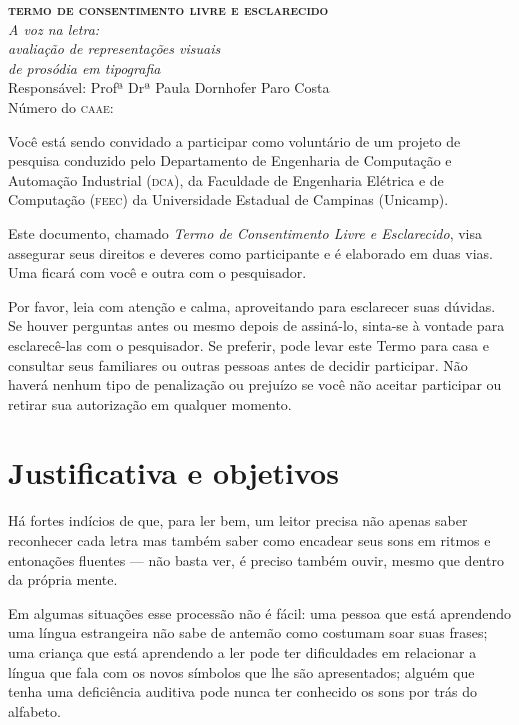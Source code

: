 \documentclass[a4paper,11pt,titlepage,singlespacing]{article}
\begin{document}


	\begin{center}
		\textbf{\Large{\textsc{termo de consentimento livre e esclarecido}}}\\
        \vspace{5pt}
        \huge\textit{A voz na letra: \\ avaliação de representações visuais \\ de prosódia em tipografia}\\
        \vspace{20pt}
        \large{Responsável: Profª Drª Paula Dornhofer Paro Costa}\\
        \vspace{10pt}
        Número do \textsc{caae}: \\
        \vspace{15pt}
	\end{center}

\noindent Você está sendo convidado a participar como voluntário de um projeto de pesquisa conduzido pelo Departamento de Engenharia de Computação e Automação Industrial (\textsc{dca}), da Faculdade de Engenharia Elétrica e de Computação (\textsc{feec}) da Universidade Estadual de Campinas (Unicamp).

Este documento, chamado \textit{Termo de Consentimento Livre e Esclarecido}, visa assegurar seus direitos e deveres como participante e é elaborado em duas vias. Uma ficará com você e outra com o pesquisador.

Por favor, leia com atenção e calma, aproveitando para esclarecer suas dúvidas. Se houver perguntas antes ou mesmo depois de assiná-lo, sinta-se à vontade para esclarecê-las com o pesquisador. Se preferir, pode levar este Termo para casa e consultar seus familiares ou outras pessoas antes de decidir participar. Não haverá nenhum tipo de penalização ou prejuízo se você não aceitar participar ou retirar sua
autorização em qualquer momento.


\section*{Justificativa e objetivos}

\noindent Há fortes indícios de que, para ler bem, um leitor precisa não apenas saber reconhecer cada letra mas também saber como encadear seus sons em ritmos e entonações fluentes — não basta ver, é preciso também ouvir, mesmo que dentro da própria mente. 

Em algumas situações esse processão não é fácil: uma pessoa que está aprendendo uma língua estrangeira não sabe de antemão como costumam soar suas frases; uma criança que está aprendendo a ler pode ter dificuldades em relacionar a língua que fala com os novos símbolos que lhe são apresentados; alguém que tenha uma deficiência auditiva pode nunca ter conhecido os sons por trás do alfabeto.
\end{document}
